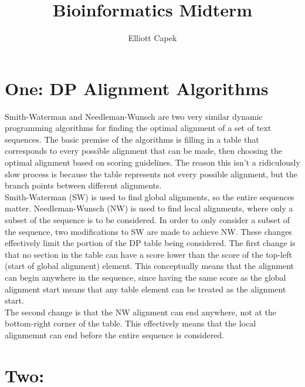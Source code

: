 \documentclass[10pt]{article} %
\title{Bioinformatics Midterm}
\author{Elliott Capek}
\begin{document}
\maketitle{}
\section{One: DP Alignment Algorithms}
Smith-Waterman and Needleman-Wunsch are two very similar dynamic programming
algorithms for finding the optimal alignment of a set of text sequences. The
basic premise of the algorithms is filling in a table that corresponds to every
possible alignment that can be made, then choosing the optimal alignment based
on scoring guidelines. The reason this isn't a ridiculously slow process is
because the table represents not every possible alignment, but the branch points
between different alignments.\\

Smith-Waterman (SW) is used to find global alignments, so the entire sequences matter.
Needleman-Wunsch (NW) is used to find local alignments, where only a subset of the
sequence is to be considered. In order to only consider a subset of the sequence,
two modifications to SW are made to achieve NW. These changes effectively limit
the portion of the DP table being considered. The first change is that no section in
the table can have a score lower than the score of the top-left (start of global
alignment) element. This conceptually means that the alignment can begin anywhere
in the sequence, since having the same score as the global alignment start means
that any table element can be treated as the alignment start.\\

The second change is that the NW alignment can end anywhere, not at the bottom-right
corner of the table. This effectively means that the local alignmemnt can end before
the entire sequence is considered.\\

\section{Two: }
\end{document}

